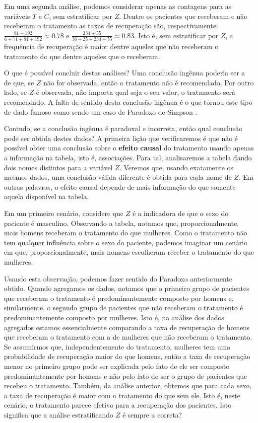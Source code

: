 Em uma segunda análise, podemos considerar
apenas as contagens para as variáveis $T$ e $C$,
sem estratificar por $Z$.
Dentre os pacientes que receberam e não receberam o tratamento
as taxas de recuperação são, respectivamente:
$\frac{81+192}{6+71+81+192} \approx 0.78$ e
$\frac{234+55}{36+25+234+55} \approx 0.83$. Isto é,
sem estratificar por $Z$, a frequência de recuperação é
maior dentre aqueles que não receberam o tratamento
do que dentre aqueles que o receberam.

O que é possível concluir destas análises?
Uma conclusão ingênua poderia ser a de que,
se $Z$ não for observada, então o tratamento não é recomendado.
Por outro lado, se $Z$ é observada, 
não importa qual seja o seu valor, o tratamento será recomendado.
A falta de sentido desta conclusão ingênua é
o que tornou este tipo de dado famoso como sendo
um caso de Paradoxo de Simpson \citep{Simpson1951}.

Contudo, se a conclusão ingênua é paradoxal e incorreta,
então qual conclusão pode ser obtida destes dados?
A primeira lição que verificaremos é que não é possível obter
uma conclusão sobre o \textbf{efeito causal} do tratamento usando
apenas a informação na tabela, isto é, associações.
Para tal, analisaremos a tabela dando 
dois nomes distintos para a variável $Z$.
Veremos que, usando exatamente os mesmos dados,
uma conclusão válida diferente é obtida para cada nome de $Z$.
Em outras palavras, o efeito causal depende de
mais informação do que somente aquela disponível na tabela.

Em um primeiro cenário, considere que $Z$ é a indicadora de que
o sexo do paciente é masculino.
Observando a tabela, notamos que, proporcionalmente, 
mais homens receberam o tratamento do que mulheres.
Como o tratamento não tem qualquer influência sobre o sexo do paciente,
podemos imaginar um cenário em que, proporcionalmente,
mais homens escolheram receber o tratamento do que mulheres.

Usando esta observação,
podemos fazer sentido do Paradoxo anteriormente obtido.
Quando agregamos os dados,
notamos que o primeiro grupo de pacientes que 
receberam o tratamento é predominantemente composto por homens e,
similarmente, o segundo grupo de 
pacientes que não receberam o tratamento é
predominantemente composto por mulheres.
Isto é, na análise dos dados agregados estamos 
essencialmente comparando a taxa de recuperação de homens 
que receberam o tratamento com
a de mulheres que não receberam o tratamento.
Se assumirmos que, independentemente do tratamento, 
mulheres tem uma probabilidade de recuperação maior do que homens,
então a taxa de recuperação menor no primeiro grupo pode ser explicada
pelo fato de ele ser composto predominantemente por homens e
não pelo fato de ser o grupo de pacientes que recebeu o tratamento.
Também, da análise anterior, obtemos que para cada sexo, 
a taxa de recuperação é maior com o tratamento  do que sem ele. 
Isto é, neste cenário, o tratamento parece efetivo para
a recuperação dos pacientes.
Isto significa que a análise estratificando $Z$ é sempre a correta?

